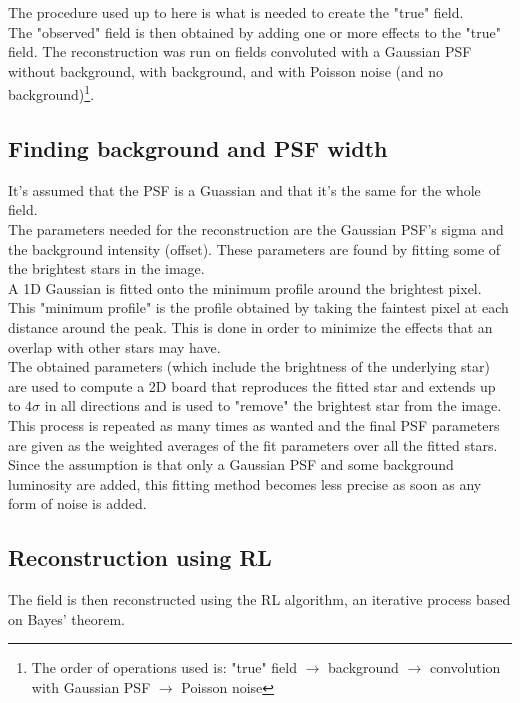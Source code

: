 \documentclass[a4paper]{article}
\begin{document}
\begin{multicols}{2}
			The procedure used up to here is what is needed to create the "true" field.\\
			
			The "observed" field is then obtained by adding one or more effects to the "true" field. The reconstruction was run on fields convoluted with a Gaussian PSF without background, with background, and with Poisson noise (and no background)\footnote{The order of operations used is: "true" field $\rightarrow$ background $\rightarrow$ convolution with Gaussian PSF $\rightarrow$ Poisson noise}.\\
			
		\subsection{Finding background and PSF width}
			It's assumed that the PSF is a Guassian and that it's the same for the whole field.\\
			
			The parameters needed for the reconstruction are the Gaussian PSF's sigma and the background intensity (offset). These parameters are found by fitting some of the brightest stars in the image.\\
			A 1D Gaussian is fitted onto the minimum profile around the brightest pixel. This "minimum profile" is the profile obtained by taking the faintest pixel at each distance around the peak. This is done in order to minimize the effects that an overlap with other stars may have.\\
			The obtained parameters (which include the brightness of the underlying star) are used to compute a 2D board that reproduces the fitted star and extends up to $4\sigma$ in all directions and is used to "remove" the brightest star from the image.\\
			This process is repeated as many times as wanted and the final PSF parameters are given as the weighted averages of the fit parameters over all the fitted stars.\\
			
			Since the assumption is that only a Gaussian PSF and some background luminosity are added, this fitting method becomes less precise as soon as any form of noise is added.\\
			
		\subsection{Reconstruction using RL}
			The field is then reconstructed using the RL algorithm, an iterative process based on Bayes' theorem.\\
			

\end{multicols}
\end{document}
